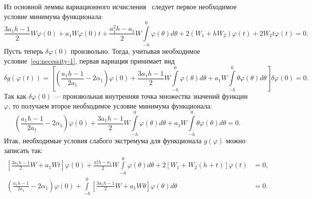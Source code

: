\documentclass[a4paper,14pt]{article}
\begin{document}
Из основной леммы вариационного исчисления~\cite[стр.~295]{elsgolc1969}
следует первое необходимое условие минимума функционала:
\begin{equation}
  \label{eq:necessity-1}
  \frac{3 a_1 h - 1}{2}
  W
  \varphi(0)
  +
  a_1 W \varphi(0) t
  +
  \frac{a_1^2 h - a_1}{2} W
  \int\limits_{-h}^{0} \varphi(\theta) d\theta
  +
  2 \left( W_1 + h W_2 \right)
  \varphi(t)
  +
  2 W_2
  t \varphi(t) = 0.
\end{equation}
Пусть теперь $\delta \varphi(0)$ произвольно. Тогда, учитывая необходимое
условие~\eqref{eq:necessity-1}, первая вариация принимает вид
\begin{equation*}
  \delta g(\varphi(t))
  =
  \left[
    \left(
      \frac{a_1 h - 1}{2 a_1}
      - 2 \alpha_1
    \right)
    \varphi(0)
    +
    \frac{3 a_1 h - 1}{2}
    W
    \int\limits_{-h}^{0} \varphi(\theta) d\theta
    +
    a_1 W
    \int\limits_{-h}^{0} \theta \varphi(\theta) d\theta
  \right] \delta \varphi(0) = 0.
\end{equation*}
Так как $\delta \varphi(0)$ --- произвольная внутренняя точка множества
значений функции $\varphi$, то получаем второе необходимое условие
минимума функционала:
\begin{equation}
  \label{eq:necessity-2}
  \left(
    \frac{a_1 h - 1}{2 a_1}
    - 2 \alpha_1
  \right)
  \varphi(0)
  +
  \frac{3 a_1 h - 1}{2}
  W
  \int\limits_{-h}^{0} \varphi(\theta) d\theta
  +
  a_1 W
  \int\limits_{-h}^{0} \theta \varphi(\theta) d\theta
  = 0.
\end{equation}
Итак, необходимые условия слабого экстремума для функционала
$g(\varphi)$ можно записать так:
\begin{equation}
  \label{eq:necessary-conds}
  \begin{aligned}
    \left[
    \frac{3 a_1 h - 1}{2}
    W
    +
    a_1 W t
    \right] \varphi(0)
    +
    \frac{a_1^2 h - a_1}{2} W
    \int\limits_{-h}^{0} \varphi(\theta) d\theta
    +
    2
    \left[
    W_1
    + W_2
    \left( h + t \right)
    \right]
    \varphi(t)
    &=
      0, \\
    \left(
    \frac{a_1 h - 1}{2 a_1}
    - 2 \alpha_1
    \right)
    \varphi(0)
    +
    \int\limits_{-h}^{0}
    \left[
    \frac{3 a_1 h - 1}{2}
    W
    +
    a_1 W \theta
    \right] \varphi(\theta) d\theta
    &=
      0.
  \end{aligned}
\end{equation}
\end{document}
